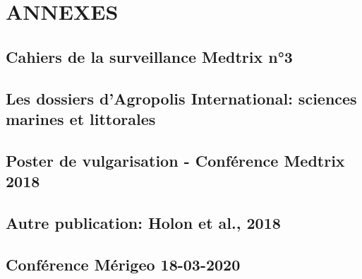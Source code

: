 \documentclass[11pt,a4paper]{book} %
\begin{document}
\part*{ANNEXES}
\pagestyle{appendix}
\clearpage
\begin{appendices}
	\noappendicestocpagenum
	\appendix
	
	\chapter{Cahiers de la surveillance Medtrix n°3} \label{annexe-cahiers}
    
    
    \chapter[Les dossiers d'Agropolis International]{Les dossiers d'Agropolis International: sciences marines et littorales} \label{annexe-agropolis}
    
    
    \chapter{Poster de vulgarisation - Conférence Medtrix 2018} \label{annexe-medtrix}
    
    
    \chapter{Autre publication: Holon et al., 2018} \label{annexe-holon}
    
    
    \chapter{Conférence Mérigeo 18-03-2020} \label{annexe-merigeo}
    
    
    


\end{appendices}


\pagestyle{abstract}
\backmatter %

\end{document}
